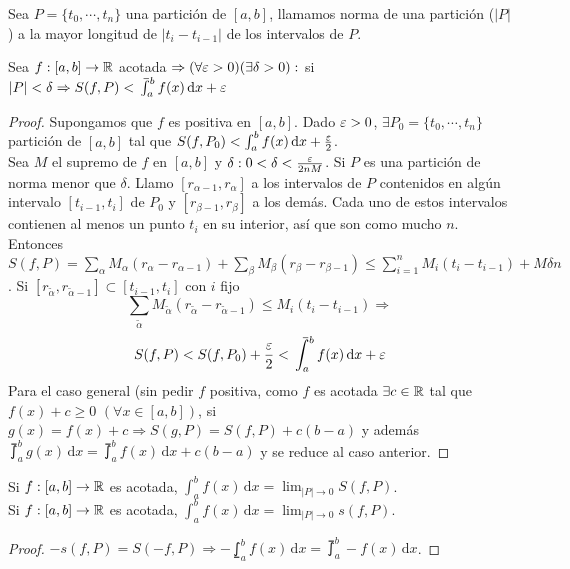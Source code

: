 \begin{definition}
  Sea $P = \{t_0, \cdots, t_n\}$ una partición de $[a, b]$, llamamos norma de una partición ($|P|$) a la mayor longitud de $|t_i - t_{i-1}|$  de los intervalos de $P$.
\end{definition}

\begin{theorem}
  Sea $f: [a, b] \to \mathbb{R}$ acotada $\Rightarrow (\forall \varepsilon > 0)(\exists \delta > 0) : $ si $|P| < \delta \Rightarrow S(f, P) < \upint_a^b f(x) \, \mathrm{d}x + \e$
  \begin{proof}
    Supongamos que $f$ es positiva en $[a, b]$. Dado $\varepsilon > 0$, $\exists P_0 = \{t_0, \cdots, t_n\}$ partición de $[a, b]$ tal que $S(f, P_0) < \int_a^b f(x) \, \mathrm{d}x + \frac{\varepsilon}{2}$. \\
    Sea $M$ el supremo de $f$ en $[a, b]$ y $\delta : 0 < \delta < \frac{\varepsilon}{2nM}$. Si $P$ es una partición de norma menor que $\delta$. Llamo $[r_{\alpha - 1}, r_{\alpha}]$ a los intervalos de $P$ contenidos en algún intervalo $[t_{i-1}, t_i]$ de $P_0$ y $[r_{\beta - 1}, r_{\beta}]$ a los demás. Cada uno de estos intervalos contienen al menos un punto $t_i$ en su interior, así que son como mucho $n$. Entonces $S(f, P) = \sum_{\alpha} M_{\alpha} (r_{\alpha} - r_{\alpha - 1}) + \sum_{\beta} M_{\beta} (r_{\beta} - r_{\beta - 1}) \leq \sum_{i = 1}^n M_i (t_i - t_{i-1}) + M \delta n$.
    Si $[r_{\tilde{\alpha}}, r_{\tilde{\alpha}-1}] \subset [t_{i-1}, t_i]$ con $i$ fijo \begin{equation}
      \sum_{\tilde{\alpha}} M_{\tilde{\alpha}} (r_{\tilde{\alpha}} - r_{\tilde{\alpha}-1}) \leq M_i (t_i - t_{i-1}) \Rightarrow
    \end{equation}
    \begin{equation}
      S(f, P) < S(f, P_0) + \frac{\e}{2} < \upint_a^b f(x) \, \mathrm{d}x + \e
    \end{equation}
    Para el caso general (sin pedir $f$ positiva, como $f$ es acotada $\exists c \in \mathbb{R}$ tal que $f(x) + c \geq 0$ $(\forall x \in [a, b])$, si $g(x) = f(x) + c \Rightarrow S(g, P) = S(f, P) + c (b-a)$ y además $\upint_a^b g(x) \, \mathrm{d}x = \upint_a^b f(x) \, \mathrm{d}x + c (b-a)$ y se reduce al caso anterior.
  \end{proof}
\end{theorem}


\begin{corollary}
  Si $f: [a, b] \to \mathbb{R}$ es acotada, $\int_a^b f(x) \, \mathrm{d}x = \lim_{|P| \to 0} S(f, P)$. \\
  Si $f: [a, b] \to \mathbb{R}$ es acotada, $\int_a^b f(x) \, \mathrm{d}x = \lim_{|P| \to 0} s(f, P)$.
  \begin{proof}
    $-s(f, P) = S(-f, P) \Rightarrow - \lowint_a^b f(x)\, \mathrm{d}x = \upint_a^b -f(x) \, \mathrm{d}x$.
  \end{proof}
\end{corollary}

